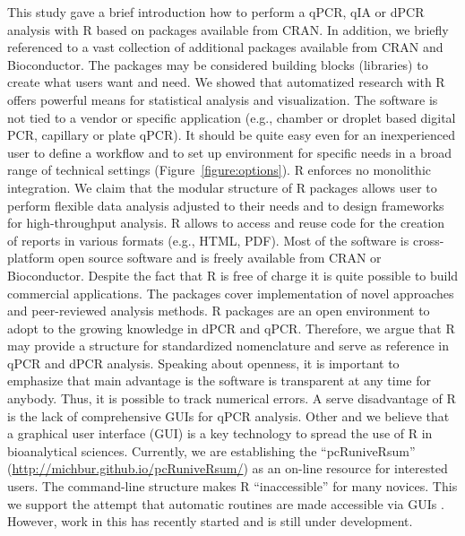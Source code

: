 This study gave a brief introduction how to perform a qPCR, qIA or dPCR 
analysis 
with R based on packages available from CRAN. In addition, we briefly 
referenced 
to a vast collection of additional packages available from CRAN and 
Bioconductor. The packages may be considered building blocks (libraries) to 
create what users want and need. We showed that automatized research with R 
offers powerful means for statistical analysis and visualization. The software 
is not tied to a vendor or specific application (e.g., chamber or droplet based 
digital PCR, capillary or plate qPCR). It should be quite easy even for an 
inexperienced user to define a workflow and to set up environment for specific 
needs in a broad range of technical settings (Figure~\ref{figure:options}). R 
enforces no monolithic integration. We claim that the modular structure of R 
packages allows user to perform flexible data analysis adjusted to their needs 
and to design frameworks for high-throughput analysis. R allows to access and 
reuse code for the creation of reports in various formats (e.g., HTML, PDF). 
Most of the software is cross-platform open source software and is freely 
available from CRAN or Bioconductor. Despite the fact that R is free of charge 
it is quite possible to build commercial applications. The packages cover 
implementation of novel approaches and peer-reviewed analysis methods. R 
packages are an open environment to adopt to the growing knowledge in dPCR and 
qPCR. Therefore, we argue that R may provide a structure for standardized 
nomenclature and serve as reference in qPCR and dPCR analysis. Speaking about 
openness, it is important to emphasize that main advantage is the software is 
transparent at any time for anybody. Thus, it is possible to track numerical 
errors.  A serve disadvantage of R is the lack of comprehensive GUIs for qPCR 
analysis. Other and we believe that a graphical user interface (GUI) is a key 
technology to spread the use of R in bioanalytical sciences. Currently, we are 
establishing the ``pcRuniveRsum'' 
(\url{http://michbur.github.io/pcRuniveRsum/}) 
as an on-line resource for interested users. The command-line structure makes R 
``inaccessible'' for many novices. This we support the attempt that automatic 
routines are made accessible via GUIs \citep{rodiger_rkward_2012}. However, 
work 
in this has recently started and is still under development.

